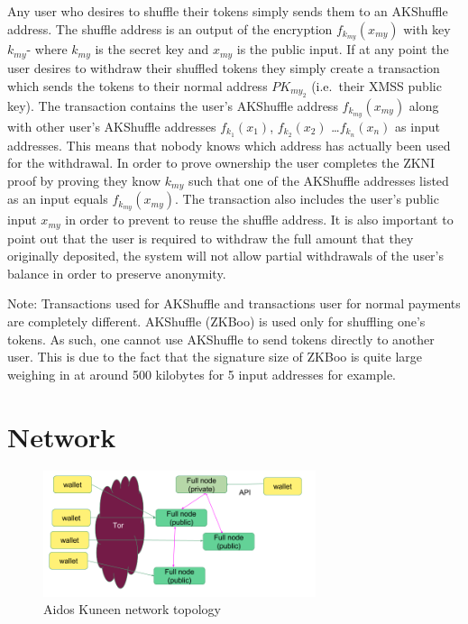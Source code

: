 \documentclass[a4paper,10pt,twocolumn]{article}
\begin{document}
Any user who desires to shuffle their tokens simply sends them to an AKShuffle address.
The shuffle address is an output of the encryption \( f_{k_{my}}(x_{my}) \) with key \( k_{my} \)-  
where \(k_{my}\) is the secret key  and \(x_{my}\) is the public input.
If at any point the user desires to withdraw their shuffled tokens they simply create a transaction which sends the tokens to their 
normal address \(PK_{my_2}\) (i.e.\ their XMSS public key).
The transaction contains the user's AKShuffle address \( f_{k_{my}}(x_{my}) \) along with other user's AKShuffle addresses 
\( f_{k_{1}}(x_{1}) \), \( f_{k_{2}}(x_{2}) \) \dots \( f_{k_{n}}(x_{n}) \) as input addresses. 
This means that nobody knows which address has actually been used for the withdrawal. 
In order to prove ownership the user completes the ZKNI proof by proving they know \( k_{my} \) such that one of the AKShuffle 
addresses listed as an input equals \( f_{k_{my}}(x_{my}) \). 
The transaction also includes the user's public input \( x_{my} \) in order to prevent to reuse the shuffle address. It is also 
important to point out that the user is required to withdraw the full amount that they originally deposited, 
the system will not allow partial withdrawals of the user's balance in order to preserve anonymity.

Note: Transactions used for AKShuffle and transactions user for normal payments are completely different. AKShuffle (ZKBoo) is used 
only for shuffling one's tokens. As such, one cannot use AKShuffle to send tokens directly to another user. This is due to the fact 
that the signature size of ZKBoo is quite large weighing in at around 500 kilobytes for 5 input addresses for example.

\section{Network}
\label{sec:network}

\begin{figure}[ht]
	\begin{center}
	\includegraphics[width=80mm]{network.png}
	  \caption{Aidos Kuneen network topology}
    \label{fig:network}
	\end{center}
 \end{figure}
\end{document}
